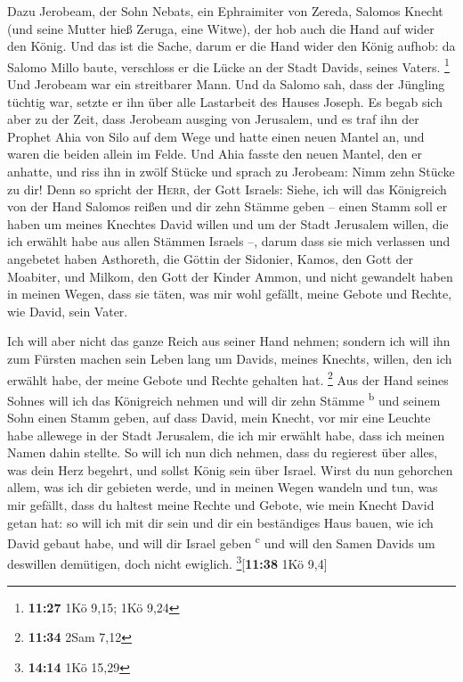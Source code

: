  Dazu Jerobeam, der Sohn Nebats, ein Ephraimiter von
Zereda, Salomos Knecht (und seine Mutter hieß Zeruga, eine Witwe), der
hob auch die Hand auf wider den König.  Und das ist die
Sache, darum er die Hand wider den König aufhob: da Salomo Millo baute,
verschloss er die Lücke an der Stadt Davids, seines Vaters. \footnote{\textbf{11:27}
  1Kö 9,15; 1Kö 9,24}  Und Jerobeam war ein streitbarer
Mann. Und da Salomo sah, dass der Jüngling tüchtig war, setzte er ihn
über alle Lastarbeit des Hauses Joseph.  Es begab sich
aber zu der Zeit, dass Jerobeam ausging von Jerusalem, und es traf ihn
der Prophet Ahia von Silo auf dem Wege und hatte einen neuen Mantel an,
und waren die beiden allein im Felde.  Und Ahia fasste
den neuen Mantel, den er anhatte, und riss ihn in zwölf Stücke
 und sprach zu Jerobeam: Nimm zehn Stücke zu dir! Denn so
spricht der \textsc{Herr}, der Gott Israels: Siehe, ich will das
Königreich von der Hand Salomos reißen und dir zehn Stämme geben --
 einen Stamm soll er haben um meines Knechtes David
willen und um der Stadt Jerusalem willen, die ich erwählt habe aus allen
Stämmen Israels --,  darum dass sie mich verlassen und
angebetet haben Asthoreth, die Göttin der Sidonier, Kamos, den Gott der
Moabiter, und Milkom, den Gott der Kinder Ammon, und nicht gewandelt
haben in meinen Wegen, dass sie täten, was mir wohl gefällt, meine
Gebote und Rechte, wie David, sein Vater.

 Ich will aber nicht das ganze Reich aus seiner Hand
nehmen; sondern ich will ihn zum Fürsten machen sein Leben lang um
Davids, meines Knechts, willen, den ich erwählt habe, der meine Gebote
und Rechte gehalten hat. \footnote{\textbf{11:34} 2Sam 7,12}
 Aus der Hand seines Sohnes will ich das Königreich
nehmen und will dir zehn Stämme \textsuperscript{b}  und
seinem Sohn einen Stamm geben, auf dass David, mein Knecht, vor mir eine
Leuchte habe allewege in der Stadt Jerusalem, die ich mir erwählt habe,
dass ich meinen Namen dahin stellte.  So will ich nun
dich nehmen, dass du regierest über alles, was dein Herz begehrt, und
sollst König sein über Israel.  Wirst du nun gehorchen
allem, was ich dir gebieten werde, und in meinen Wegen wandeln und tun,
was mir gefällt, dass du haltest meine Rechte und Gebote, wie mein
Knecht David getan hat: so will ich mit dir sein und dir ein beständiges
Haus bauen, wie ich David gebaut habe, und will dir Israel geben
\textsuperscript{c}  und will den Samen Davids um
deswillen demütigen, doch nicht ewiglich. \footnote{\textbf{14:14} 1Kö
  15,29}{[}\textbf{11:38} 1Kö 9,4{]}

